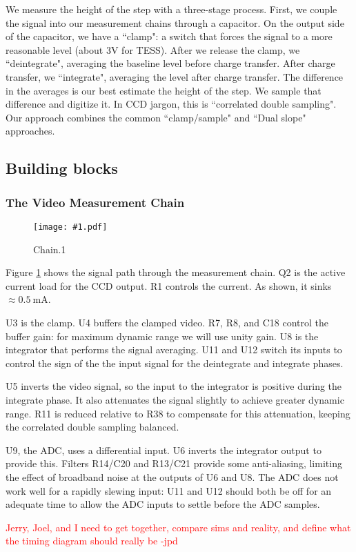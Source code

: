 \documentclass[12pt]{article}
\let\oldsubsection\subsection
\renewcommand{\subsection}{\FloatBarrier\oldsubsection}
\let\oldsubsubsection\subsubsection
\renewcommand{\subsubsection}{\FloatBarrier\oldsubsubsection}
\newcommand{\schempage}[1]{
   \begin{figure}[ht!]
   \centerline{\texttt{[image: \#1.pdf]}}
    \caption{#1}
    \label{#1}
    \end{figure}
}
\begin{document}
We measure the height of the step with a three-stage process. First, we couple the signal into our measurement chains through a capacitor. On the output side of the capacitor, we have a ``clamp": a switch that forces the signal to a more reasonable level (about 3V for TESS). After we release the clamp, we ``deintegrate", averaging the baseline level before charge transfer. After charge transfer, we ``integrate", averaging the level after charge transfer. The difference in the averages is our best estimate the height of the step. We sample that difference and digitize it. In CCD jargon, this is ``correlated double sampling". Our approach combines the common ``clamp/sample" and ``Dual slope" approaches.
\subsection{Building blocks}
\subsubsection{The Video Measurement Chain}
\schempage{Chain.1}
Figure \ref{Chain.1} shows the signal path through the measurement chain.
Q2 is the active current load for the CCD output. R1 controls the current. As shown, it sinks $\approx0.5\ $mA.

U3 is the clamp. U4 buffers the clamped video. R7, R8, and C18 control the buffer gain: for maximum dynamic range we will use unity gain. U8 is the integrator that performs the signal averaging. U11 and U12 switch its inputs to control the sign of the the input signal for the deintegrate and integrate phases. 

U5 inverts the video signal, so the input to the integrator is positive during the integrate phase. It also attenuates the signal slightly to achieve greater dynamic range. R11 is reduced relative to R38 to compensate for this attenuation, keeping the correlated double sampling balanced.

U9, the ADC, uses a differential input. U6 inverts the integrator output to provide this. Filters R14/C20 and R13/C21 provide some anti-aliasing, limiting the effect of broadband noise at the outputs of U6 and U8. The ADC does not work well for a rapidly slewing input: U11 and U12 should both be off for an adequate time to allow the ADC inputs to settle before the ADC samples.

\textcolor{red}{Jerry, Joel, and I need to get together, compare sims and reality, and define what the timing diagram should really be -jpd}
\end{document}
